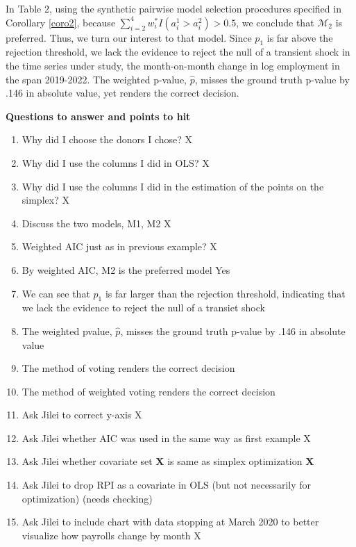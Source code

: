\documentclass[11pt]{article}
\def\mc#1{\mathcal{#1}} %
\def\mc#1{\mathcal{#1}}
\theoremstyle{definition}
\begin{document}
In Table 2, using the synthetic pairwise model selection procedures specified in Corollary \ref{coro2}, because $\sum_{i=2}^4 w_i^* I(a_i^1 > a_i^2)>0.5$,  we conclude that  $\mc{M}_2$ is preferred. Thus, we turn our interest to that model.  Since $p_{1}$ is far above the rejection threshold, we lack the evidence to reject the null of a transient shock in the time series under study, the month-on-month change in log employment in the span 2019-2022.  The weighted p-value, $\hat p $, misses the ground truth p-value by .146 in absolute value, yet renders the correct decision.




\textbf{Questions to answer and points to hit}
\begin{enumerate}
\item Why did I choose the donors I chose? X 
\item Why did I use the columns I did in OLS? X
\item Why did I use the columns I did in the estimation of the points on the simplex? X
\item Discuss the two models, M1, M2 X
\item Weighted AIC just as in previous example?  X
\item By weighted AIC, M2 is the preferred model Yes
\item We can see that $p_{1}$ is far larger than the rejection threshold, indicating that we lack the evidence to reject the null of a transiet shock
\item The weighted pvalue, $\hat p $, misses the ground truth p-value by .146 in absolute value
\item The method of voting renders the correct decision
\item The method of weighted voting renders the correct decision
\item Ask Jilei to correct y-axis X
\item Ask Jilei whether AIC was used in the same way as first example X
\item Ask Jilei whether covariate set $\textbf{X}$ is same as simplex optimization $\textbf{X}$ 
\item Ask Jilei to drop RPI as a covariate in OLS (but not necessarily for optimization) (needs checking)
\item Ask Jilei to include chart with data stopping at March 2020 to better visualize how payrolls change by month X

\end{enumerate}
\end{document}
